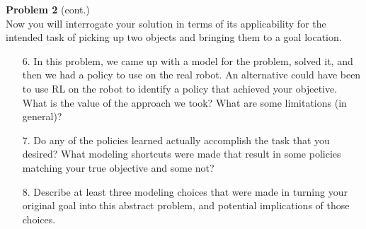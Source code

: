 \documentclass[submit]{harvardml}
\begin{document}
\newpage 

\begin{framed}
\textbf{Problem 2} (cont.)\\

Now you will interrogate your solution in terms of its applicability
for the intended task of picking up two objects and bringing them to a
goal location.

\begin{itemize}

  \item[6.] In this problem, we came up with a model for the problem,
    solved it, and then we had a policy to use on the real robot.  An
    alternative could have been to use RL on the robot to identify a
    policy that achieved your objective.  What is the value of the
    approach we took?  What are some limitations (in general)? 


  \item[7.] Do any of the policies learned actually accomplish the task
    that you desired?  What modeling shortcuts were made that result
    in some policies matching your true objective and some not?

    
  \item[8.] Describe at least three modeling choices that were made in
    turning your original goal into this abstract problem, and
    potential implications of those choices.
 

\end{itemize}

\end{framed}


\newpage 
\end{document}
